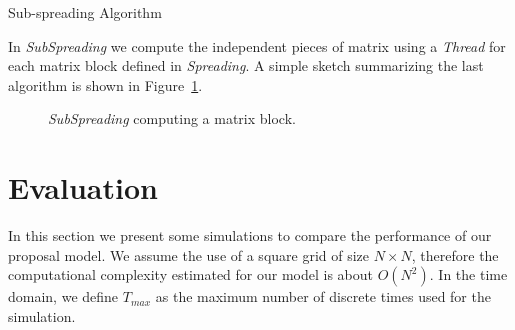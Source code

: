 \documentclass[conference]{IEEEtran}
\begin{document}
      \begin{algorithm}[h]
        \small
        \begin{algorithmic}
              \EndFor
            \EndFor
          \EndProcedure
        \end{algorithmic}
        \caption{Sub-spreading Algorithm}
        \label{alg:subspreading}
      \end{algorithm}
      
      In \emph{SubSpreading} we compute the independent pieces of matrix using a \emph{Thread} for each 
      matrix block defined in \emph{Spreading}. A simple sketch summarizing the last algorithm is shown 
      in Figure~\ref{fig:thread}. 
      \begin{figure}[!ht]
        \centering
        \resizebox{\columnwidth}{!}{
          
        }    
        \caption{\emph{SubSpreading} computing a matrix block.}
        \label{fig:thread}
      \end{figure}
        
        
  \section{Evaluation}
    
    In this section we present some simulations to compare the performance of our proposal model.
    We assume the use of a square grid of size $N \times N$, therefore the computational complexity estimated
    for our model is about $O(N^2)$. In the time domain, we define $T_{max}$ as the maximum number
    of discrete times used for the simulation. %

    
\end{document}
